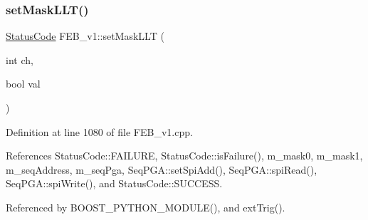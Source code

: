 \subsubsection{\texorpdfstring{set\+Mask\+L\+L\+T()}{setMaskLLT()}}
{\footnotesize\ttfamily \hyperlink{classStatusCode}{Status\+Code} F\+E\+B\+\_\+v1\+::set\+Mask\+L\+LT (\begin{DoxyParamCaption}\item[{int}]{ch,  }\item[{bool}]{val }\end{DoxyParamCaption})}



Definition at line 1080 of file F\+E\+B\+\_\+v1.\+cpp.



References Status\+Code\+::\+F\+A\+I\+L\+U\+RE, Status\+Code\+::is\+Failure(), m\+\_\+mask0, m\+\_\+mask1, m\+\_\+seq\+Address, m\+\_\+seq\+Pga, Seq\+P\+G\+A\+::set\+Spi\+Add(), Seq\+P\+G\+A\+::spi\+Read(), Seq\+P\+G\+A\+::spi\+Write(), and Status\+Code\+::\+S\+U\+C\+C\+E\+SS.



Referenced by B\+O\+O\+S\+T\+\_\+\+P\+Y\+T\+H\+O\+N\+\_\+\+M\+O\+D\+U\+L\+E(), and ext\+Trig().



